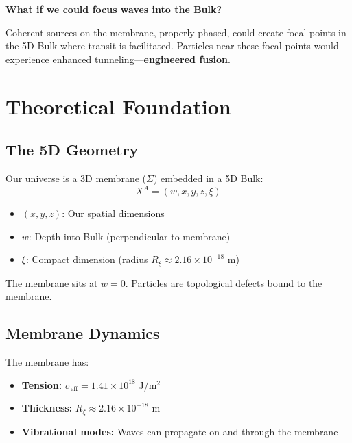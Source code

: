 \documentclass[12pt,a4paper]{article}
\begin{document}
\begin{insight}
\textbf{What if we could focus waves into the Bulk?}

Coherent sources on the membrane, properly phased, could create focal points in the 5D Bulk where transit is facilitated. Particles near these focal points would experience enhanced tunneling---\textbf{engineered fusion}.
\end{insight}

\section{Theoretical Foundation}

\subsection{The 5D Geometry}

Our universe is a 3D membrane ($\Sigma$) embedded in a 5D Bulk:
\begin{equation}
X^A = (w, x, y, z, \xi)
\end{equation}

\begin{itemize}
    \item $(x, y, z)$: Our spatial dimensions
    \item $w$: Depth into Bulk (perpendicular to membrane)
    \item $\xi$: Compact dimension (radius $R_\xi \approx 2.16 \times 10^{-18}$ m)
\end{itemize}

The membrane sits at $w = 0$. Particles are topological defects bound to the membrane.

\subsection{Membrane Dynamics}

The membrane has:
\begin{itemize}
    \item \textbf{Tension:} $\sigma_{\text{eff}} = 1.41 \times 10^{18}$ J/m$^2$
    \item \textbf{Thickness:} $R_\xi \approx 2.16 \times 10^{-18}$ m
    \item \textbf{Vibrational modes:} Waves can propagate on and through the membrane
\end{itemize}
\end{document}
